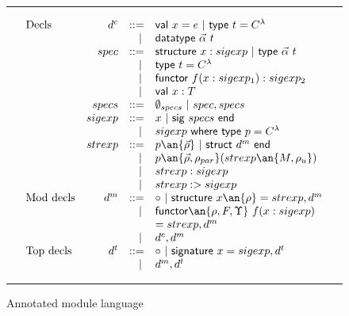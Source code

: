 
\begin{figure}
\hrule
\[
\begin{array}{lrcl}
\textrm{Decls} & d^c & ::= & \mathsf{val}~x=e~
|~\mathsf{type}~t=C^\lambda\\
 & & ~~| & \mathsf{datatype}~\vec{\alpha}~t\\
        & spec & ::= & \mathsf{structure}~x :
        sigexp~|~\mathsf{type}~\vec{\alpha}~t\\
        & & ~~| & \mathsf{type}~t = C^\lambda\\ 
	& & ~~| & \mathsf{functor}~f(x:sigexp_1) : sigexp_2\\
        & & ~~| & \mathsf{val}~x:T\\
        & specs & ::= & \emptyset_{specs}~|~spec, specs\\
	& sigexp & ::= &
        x~|~\mathsf{sig}~specs~\mathsf{end}\\
        & & ~~| & sigexp~\mathsf{where~
          type}~p=C^\lambda\\
	& strexp & ::= & p\an{\vec{\rho}}~|~\mathsf{struct} ~d^m~\mathsf{end}\\
        & & ~~| & p\an{\vec{\rho},\rho_{par}}(strexp\an{M,\rho_u})\\
        & & ~~| & strexp:sigexp\\
        & & ~~| & strexp:>sigexp\\
\textrm{Mod decls}	& d^m & ::= & \circ~|~\mathsf{structure}~x\an{\rho} = strexp,
d^m\\
       & & ~~| & \mathsf{functor}\an{\rho,F,\Upsilon}
       ~f(x:sigexp)\\
       & &  & =strexp, d^m\\
       & & ~~| & d^c, d^m\\
\textrm{Top decls} & d^t & ::= &
\circ~|~\mathsf{signature}~x=sigexp,d^t\\ 
& & ~~| & d^m,d^t

\end{array}
\]
\hrule
\caption{Annotated module language}
\label{fig:annotatedlang}
\end{figure}

